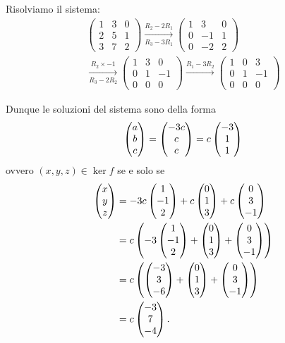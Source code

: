 \begin{example}
    Risolviamo il sistema: \begin{gather*}
        \begin{pmatrix}
            1 & 3 & 0 \\
            2 & 5 & 1 \\
            3 & 7 & 2 
        \end{pmatrix} \xrightarrow[R_3 - 3R_1]{R_2 - 2R_1}
        \begin{pmatrix}
            1 & 3 & 0 \\
            0 & -1 & 1 \\
            0 & -2 & 2 
        \end{pmatrix} \\ \xrightarrow[R_3 - 2R_2]{R_2 \times -1}
        \begin{pmatrix}
            1 & 3 & 0 \\
            0 & 1 & -1 \\
            0 & 0 & 0 
        \end{pmatrix} \xrightarrow[]{R_1 - 3R_2}
        \begin{pmatrix}
            1 & 0 & 3 \\
            0 & 1 & -1 \\
            0 & 0 & 0 
        \end{pmatrix}
    \end{gather*}

    Dunque le soluzioni del sistema sono della forma \[
        \begin{pmatrix} a\\b\\c \end{pmatrix} = \begin{pmatrix} -3c\\c\\c \end{pmatrix} = c\begin{pmatrix} -3\\1\\1 \end{pmatrix}    
    \] ovvero $(x, y, z) \in \ker f$ se e solo se \begin{align*}
        \begin{pmatrix} x\\y\\z \end{pmatrix} &= -3c\begin{pmatrix} 1\\-1\\2 \end{pmatrix} + c\begin{pmatrix} 0\\1\\3 \end{pmatrix} + c\begin{pmatrix} 0\\3\\-1 \end{pmatrix}\\
        &= c\left(-3\begin{pmatrix} 1\\-1\\2 \end{pmatrix} + \begin{pmatrix} 0\\1\\3 \end{pmatrix} + \begin{pmatrix} 0\\3\\-1 \end{pmatrix}\right)\\
        &= c\left(\begin{pmatrix} -3\\3\\-6 \end{pmatrix} + \begin{pmatrix} 0\\1\\3 \end{pmatrix} + \begin{pmatrix} 0\\3\\-1 \end{pmatrix}\right)\\
        &= c\begin{pmatrix} -3\\7\\-4 \end{pmatrix}.
    \end{align*}


\end{example}
